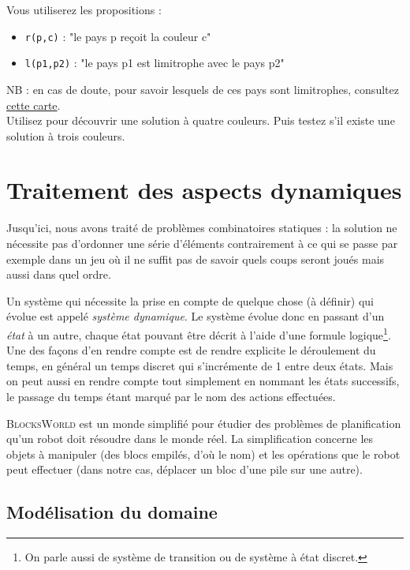 \noindent Vous utiliserez les propositions : 
\begin{itemize}
\item \texttt{r(p,c)} : "le pays p reçoit la couleur c"
\item \texttt{l(p1,p2)} : "le pays p1 est limitrophe avec le pays p2"
\end{itemize}

NB : en cas de doute, pour savoir lesquels de ces pays sont limitrophes, consultez \href{https://upload.wikimedia.org/wikipedia/commons/6/6a/Europe_countries_map_fr.png}{cette carte}. \\

Utilisez \touist pour découvrir une solution à quatre couleurs. Puis testez s'il existe une solution à trois couleurs. 
\newpage
\section{Traitement des aspects dynamiques}\label{sec:prob}
Jusqu'ici, nous avons traité de problèmes combinatoires statiques : la solution ne nécessite pas d'ordonner une série d'éléments contrairement à ce qui se passe par exemple dans un jeu où il ne suffit pas de savoir quels coups seront joués mais aussi dans quel ordre. 

Un système qui nécessite la prise en compte de quelque chose (à définir) qui évolue est appelé \emph{système dynamique}. Le système évolue donc en passant d'un \emph{état} à un autre, chaque état pouvant être décrit à l'aide d'une formule logique\footnote{On parle aussi de système de transition ou de système à état discret.}. Une des façons d'en rendre compte est de rendre explicite le déroulement du temps, en général un temps discret qui s'incrémente de 1 entre deux états. Mais on peut aussi en rendre compte tout simplement en nommant les états successifs, le passage du temps étant marqué par le nom des actions effectuées. 

\textsc{BlocksWorld} est un monde simplifié pour étudier des problèmes de
planification qu'un robot doit résoudre dans le monde réel. La simplification
concerne les objets à manipuler (des blocs empilés, d'où le nom) et les
opérations que le robot peut effectuer (dans notre cas, déplacer un bloc d'une
pile sur une autre). 
\subsection{Modélisation du domaine}\label{sec:form_dom}

